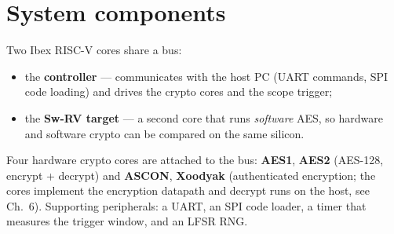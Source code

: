 \documentclass[11pt,a4paper]{report}
\begin{document}
\section{System components}
Two Ibex RISC-V cores share a bus:
\begin{itemize}[leftmargin=1.4em]
\item the \textbf{controller} --- communicates with the host PC (UART commands, SPI code
loading) and drives the crypto cores and the scope trigger;
\item the \textbf{Sw-RV target} --- a second core that runs \emph{software} AES,
so hardware and software crypto can be compared on the same silicon.
\end{itemize}
Four hardware crypto cores are attached to the bus: \textbf{AES1}, \textbf{AES2}
(AES-128, encrypt + decrypt) and \textbf{ASCON}, \textbf{Xoodyak} (authenticated
encryption; the cores implement the encryption datapath and decrypt runs on the
host, see Ch.~6). Supporting peripherals: a UART, an SPI code loader, a timer
that measures the trigger window, and an LFSR RNG.
\end{document}

